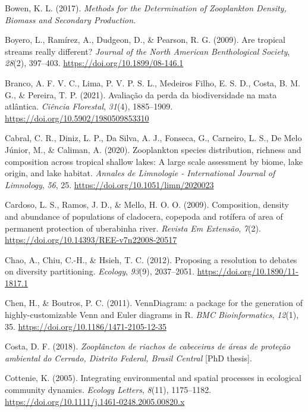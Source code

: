 \documentclass[
  letterpaper,
  DIV=11,
  numbers=noendperiod]{scrartcl}
\newlength{\cslhangindent}
\newenvironment{CSLReferences}[2] %
 {\begin{list}{}{%
  \setlength{\itemindent}{0pt}
  \setlength{\leftmargin}{0pt}
  \setlength{\parsep}{0pt}
  \ifodd #1
   \setlength{\leftmargin}{\cslhangindent}
   \setlength{\itemindent}{-1\cslhangindent}
  \fi
  \setlength{\itemsep}{#2\baselineskip}}}
 {\end{list}}
\begin{document}
\begin{CSLReferences}{1}{0}
Bowen, K. L. (2017). \emph{Methods for the Determination of Zooplankton
Density, Biomass and Secondary Production}.

Boyero, L., Ramírez, A., Dudgeon, D., \& Pearson, R. G. (2009). Are
tropical streams really different? \emph{Journal of the North American
Benthological Society}, \emph{28}(2), 397--403.
\url{https://doi.org/10.1899/08-146.1}

Branco, A. F. V. C., Lima, P. V. P. S. L., Medeiros Filho, E. S. D.,
Costa, B. M. G., \& Pereira, T. P. (2021). Avaliação da perda da
biodiversidade na mata atlântica. \emph{Ciência Florestal},
\emph{31}(4), 1885--1909. \url{https://doi.org/10.5902/1980509853310}

Cabral, C. R., Diniz, L. P., Da Silva, A. J., Fonseca, G., Carneiro, L.
S., De Melo Júnior, M., \& Caliman, A. (2020). Zooplankton species
distribution, richness and composition across tropical shallow lakes: A
large scale assessment by biome, lake origin, and lake habitat.
\emph{Annales de Limnologie - International Journal of Limnology},
\emph{56}, 25. \url{https://doi.org/10.1051/limn/2020023}

Cardoso, L. S., Ramos, J. D., \& Mello, H. O. O. (2009). Composition,
density and abundance of populations of cladocera, copepoda and rotífera
of area of permanent protection of uberabinha river. \emph{Revista Em
Extensão}, \emph{7}(2).
\url{https://doi.org/10.14393/REE-v7n22008-20517}

Chao, A., Chiu, C.-H., \& Hsieh, T. C. (2012). Proposing a resolution to
debates on diversity partitioning. \emph{Ecology}, \emph{93}(9),
2037--2051. \url{https://doi.org/10.1890/11-1817.1}

Chen, H., \& Boutros, P. C. (2011). VennDiagram: a package for the
generation of highly-customizable Venn and Euler diagrams in R.
\emph{BMC Bioinformatics}, \emph{12}(1), 35.
\url{https://doi.org/10.1186/1471-2105-12-35}

Costa, D. F. (2018). \emph{Zooplâncton de riachos de cabeceiras de áreas
de proteção ambiental do Cerrado, Distrito Federal, Brasil Central}
{[}PhD thesis{]}.

Cottenie, K. (2005). Integrating environmental and spatial processes in
ecological community dynamics. \emph{Ecology Letters}, \emph{8}(11),
1175--1182. \url{https://doi.org/10.1111/j.1461-0248.2005.00820.x}


\end{CSLReferences}
\end{document}
